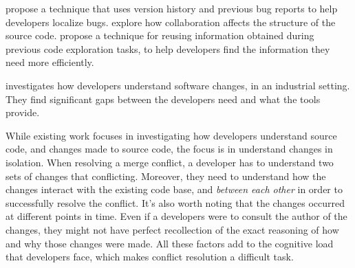 \citet{wang2015version} propose a technique that uses version history and previous bug reports to help developers localize bugs.
\citet{panichella2014how} explore how collaboration affects the structure of the source code.
\citet{robillard2008reusing} propose a technique for reusing information obtained during previous code exploration tasks, to help developers find the information they need more efficiently. 

\citet{tao2012how} investigates how developers understand software changes, in an industrial setting.
They find significant gaps between the developers need and what the tools provide.

While existing work focuses in investigating how developers understand source code, and changes made to source code, the focus is in understand changes in isolation.
When resolving a merge conflict, a developer has to understand two sets of changes that conflicting.
Moreover, they need to understand how the changes interact with the existing code base, and \emph{between each other} in order to successfully resolve the conflict.
It's also worth noting that the changes occurred at different points in time.
Even if a developers were to consult the author of the changes, they might not have perfect recollection of the exact reasoning of how and why those changes were made.
All these factors add to the cognitive load that developers face, which makes conflict resolution a difficult task.